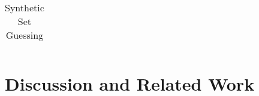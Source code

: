 \documentclass[11pt,fleqn,twoside]{article}
\newif\iffinal\finalfalse
\newcommand{\nop}[1]{}
\newcommand{\leanparagraph}[1]{\smallskip\noindent\textbf{#1}}
\newtheorem{example}{Example}
\begin{document}
{\begin{table}[t]
\begin{tabular}[t]{|r|r|r|r|r|r|r|r|r|r|r|r|r|r|r|}
					\hline
				\end{tabular}
				\caption{Synthetic Set Guessing}
				\label{tab:synthetic}
			\end{table}
}

		\nop{
		\begin{example}[Synthetic Example]
		\ 

		\begin{verbatim}
% monolithic: grounding problem
% because external atoms are
% evaluated under exponentially
% many interpretations

% splitting: solving problem
% because constraint at the
% bottom cannot eliminate guesses

% Unit 1:
% the following rules let the
% heuristics split before the main part
% (since monotonicity of &id is not known)
p(a). p(b). p(c). p(d).
q(a). q(c). q(e).
pi(X) :- p(X).
qi(X) :- q(X).
y(X) v n(X) :- #int(X).
someN :- n(X).

% ----- split -----

% Unit 2:
po(X) :- &id[pi](X).
qo(X) :- &id[qi](X).
allY :- not someN.

% ----- split -----

% Unit 3:
% main check
res(X) :- &setMinus[po,qo](X).
:- res(X), not allY.
		\end{verbatim}
		\end{example}
		}


	\section{Discussion and Related Work}
	\label{sec:related}
\end{document}
